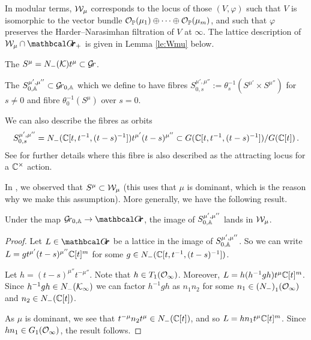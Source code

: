 \documentclass{article}
\begin{document}
In modular terms, $\cW_\mu$ corresponds to the locus of those $ (V, \varphi)$ such that $ V $ is isomorphic to the vector bundle $ \cO_{\PP}(\mu_1) \oplus \cdots \oplus \cO_{\PP}(\mu_m)$, and such that $ \varphi$ preserves the {Harder--Narasimhan filtration of $V$ at $ \infty$}. The lattice description of $ \cW_\mu \cap \Grth_+$ is given in Lemma \ref{le:Wmu} below. 
% 
\begin{definition}\label{def:inftyorbit}
    The  $ S^\mu = N_-(\cK)t^\mu \subset \Gr $.
\end{definition}
% 
\begin{definition}\label{def:inftyorbitfam}
    The  $S^{\mu', \mu''}_{0,\AA} \subset \Grbd$ which we define to have fibres $ S^{\mu', \mu''}_{0,s} := \theta_s^{-1}( S^{\mu'}\times S^{\mu''}) $ for $ s \ne 0$ and fibre $ \theta_0^{-1}(S^{\mu})$ over $ s = 0 $.
\end{definition}
% 
We can also describe the fibres as orbits
$$
    S^{\mu', \mu''}_{0,s} = 
    N_-(\CC[t, t^{-1}, (t-s)^{-1}])t^{\mu'} (t-s)^{\mu''} \subset G(\CC[t,t^{-1}, (t-s)^{-1}]) / G(\CC[t]) \,. 
$$
See \cite[Section~5.2]{baumann2020bases} for further details where this fibre is also described as the attracting locus for a $\Cx$ action.

In \cite[Prop~2.6]{kamnitzer2014yangians}, we observed that $ S^\mu \subset \cW_\mu$ (this uses that $\mu$ is dominant, which is the reason why we make this assumption).  More generally, we have the following result.

\begin{lemma}\label{le:inftyfusiskl} 
    Under the map $ \Grbd \rightarrow \Grth$, the image of $ S^{\mu', \mu''}_{0,\AA}$ lands in $ \cW_\mu$.
\end{lemma}
% 
\begin{proof}
    Let $ L \in\Grth$ be a lattice in the image of $S^{\mu',\mu''}_{0,\AA}$. So we can write $ L = g t^{\mu'} (t-s)^{\mu''}\CC[t]^m$ for some $ g \in N_-(\CC[t, t^{-1}, (t-s)^{-1}]) $. 
    
    Let $ h =(t-s)^{\mu''} t^{-\mu''}  $.  Note that $ h \in T_1(\Oinf)$. 
    Moreover, $L = h (h^{-1} g h) t^{\mu}\CC[t]^m$. 
    Since $h^{-1} g h \in N_-(\cK_\infty)$ we can factor $ h^{-1} g h$ as $n_1 n_2$ for some $ n_1 \in {(N_-)}_1(\Oinf)$ and $n_2 \in {N_-}(\CC[t]) $. 
    
    As $ \mu $ is dominant, we see that $ t^{-\mu} n_2 t^\mu \in N_-(\CC[t]) $, and so $ L = h n_1 t^\mu \CC[t]^m$.  Since $ hn_1 \in G_1(\Oinf)$, the result follows. 
\end{proof}
% 
\end{document}
